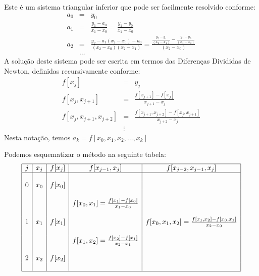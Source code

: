 Este é um sistema triangular inferior que pode ser facilmente resolvido conforme:
\begin{eqnarray*}
a_0&=&y_0\\
a_1&=&\frac{y_1-a_0}{x_1-x_0}=\frac{y_1-y_0}{x_1-x_0}\\
a_2&=&\frac{y_2-a_1(x_2-x_0)-a_0}{(x_2-x_0)(x_2-x_1)}=\frac{\frac{y_2-y_1}{(x_2-x_1)}-\frac{y_1-y_0}{(x_1-x_0)}}{(x_2-x_0)}\\
&\ldots&
\end{eqnarray*}
A solução deste sistema pode ser escrita em termos das Diferenças Divididas de Newton, definidas recursivamente conforme:
\begin{eqnarray*}
f[x_j]&=&y_j\\
f[x_j,x_{j+1}]&=&\frac{f[x_{j+1}]-f[x_j]}{x_{j+1}-x_j}\\
f[x_j,x_{j+1},x_{j+2}]&=&\frac{f[x_{j+1},x_{j+2}]-f[x_j,x_{j+1}]}{x_{j+2}-x_j}\\
&\vdots&
\end{eqnarray*}
Nesta notação, temos
$a_k=f[x_0,x_1,x_2,\ldots,x_k]$

Podemos esquematizar o método na seguinte tabela:
$$
\begin{array}{|c|c|c|c|c|}\hline
 j&x_j&f[x_j]&f[x_{j-1},x_j]&f[x_{j-2},x_{j-1},x_j]\\\hline
&&&&\\
0& x_0 & f[x_0]&&\\
&&&&\\
&&&f[x_0,x_1]=\frac{f[x_1]-f[x_0]}{x_1-x_0}&\\
&&&&\\
1&x_1&f[x_1]&&f[x_0,x_1,x_2]=\frac{f[x_1,x_2]-f[x_0,x_1]}{x_2-x_0}\\
&&&&\\
&&&f[x_1,x_2]=\frac{f[x_2]-f[x_1]}{x_2-x_1}&\\
&&&&\\
2&x_2&f[x_2]&&\\
&&&&\\ \hline
\end{array}
$$

